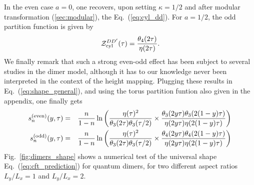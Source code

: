 \documentclass[11pt]{iopart}
\begin{document}
In the even case $a=0$, one recovers, upon setting $\kappa=1/2$ and after modular transformation (\ref{sec:modular}), the Eq.~(\ref{eq:cyl_dd}). For $a=1/2$, the odd partition function is given by 
\begin{equation}
 \mathcal{Z}_{\rm cyl}^{DD^\prime}(\tau)=\frac{\theta_4(2\tau)}{\eta(2\tau)}.
\end{equation}
We finally remark that such a strong even-odd effect has been subject to several studies in the dimer model\cite{Ferdinand,Dimers_all,Ruelledimers}, although it has to our knowledge never been interpreted in the context of the height mapping. Plugging these results in Eq.~(\ref{eq:shape_general}), and using the torus partition funtion\cite{BigYellowBook} also given in the appendix, one finally gets
\begin{eqnarray}\label{eq:cft_prediction}
 s_n^{\rm (even)}(y,\tau)&=&\frac{n}{1-n}\ln \left(\frac{\eta(\tau)^2}{\theta_3(2\tau)\theta_3(\tau/2)}\times\frac{\theta_3(2y \tau)\theta_3(2(1-y)\tau)}{\eta(2y\tau)\eta(2(1-y)\tau)}\right)\\\label{eq:cft_prediction_odd}
 s_n^{\rm (odd)}(y,\tau)&=&\frac{n}{1-n}\ln \left(\frac{\eta(\tau)^2}{\theta_3(2\tau)\theta_3(\tau/2)}\times\frac{\theta_4(2y \tau)\theta_4(2(1-y)\tau)}{\eta(2y\tau)\eta(2(1-y)\tau)}\right)
\end{eqnarray}
Fig.~\ref{fig:dimers_shape} shows a numerical test of the universal shape Eq.~(\ref{eq:cft_prediction}) for quantum dimers, for two different aspect ratios $L_y/L_x=1$ and $L_y/L_x=2$.  
\end{document}
